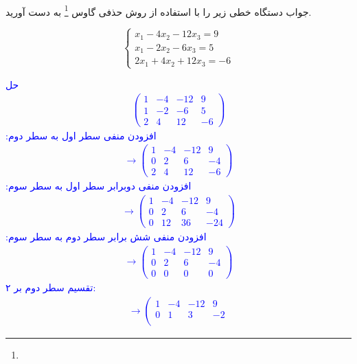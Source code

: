 \\
جواب دستگاه خطی زیر را با استفاده از روش حذفی گاوس
\footnote{}
 به دست آورید.
\\
\begin{center}
\[
    \begin{cases}
      x_1 - 4x_2 -12x_3 = 9\\
      x_1 - 2x_2 - 6x_3 = 5\\
      2x_1 + 4x_2 + 12x_3 = -6
    \end{cases}
\]
\end{center}

\textcolor{blue}{حل
\\
\begin{align*}
    \left(\begin{array}{ccc|c}  
 1 & -4 & -12 & 9 \\  
 1 & -2 & -6 & 5  \\ 
 2 & 4 & 12 & -6
\end{array}\right)
\end{align*}
افزودن منفی سطر اول به سطر دوم:
\begin{align*}
    \rightarrow \left(\begin{array}{ccc|c}  
 1 & -4 & -12 & 9 \\  
 0 & 2 & 6 & -4  \\ 
 2 & 4 & 12 & -6
\end{array}\right)
\end{align*}
افزودن منفی دوبرابر سطر اول به سطر سوم:
\begin{align*}
    \rightarrow \left(\begin{array}{ccc|c}  
 1 & -4 & -12 & 9 \\  
 0 & 2 & 6 & -4  \\ 
 0 & 12 & 36 & -24
\end{array}\right)
\end{align*}
افزودن منفی شش برابر سطر دوم به سطر سوم:
\begin{align*}
    \rightarrow \left(\begin{array}{ccc|c}  
 1 & -4 & -12 & 9 \\  
 0 & 2 & 6 & -4  \\ 
 0 & 0 & 0 & 0
\end{array}\right)
\end{align*}
تقسیم سطر دوم بر ۲:
\begin{align*}
    \rightarrow \left(\begin{array}{ccc|c}  
 1 & -4 & -12 & 9 \\  
 0 & 1 & 3 & -2  \\ 

\end{array}
\end{align*}}
